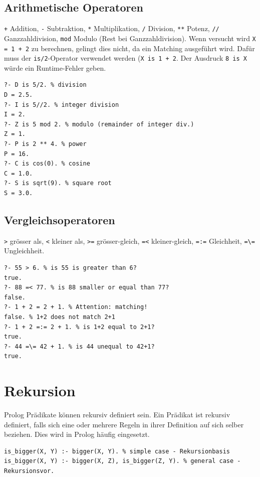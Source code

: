 \subsection{Arithmetische Operatoren}
\verb|+| Addition, \verb|-| Subtraktion, \verb|*| Multiplikation, \verb|/| Division, \verb|**| Potenz, \verb|//| Ganzzahldivision, \verb|mod| Modulo (Rest bei Ganzzahldivision). Wenn versucht wird \verb|X = 1 + 2| zu berechnen, gelingt dies nicht, da ein Matching ausgeführt wird. Dafür muss der \verb|is/2|-Operator verwendet werden (\verb|X is 1 + 2|. Der Ausdruck \verb|8 is X| würde ein Runtime-Fehler geben.

\begin{lstlisting}[caption=Arithmetische Terme]
?- D is 5/2. % division
D = 2.5.
?- I is 5//2. % integer division
I = 2.
?- Z is 5 mod 2. % modulo (remainder of integer div.)
Z = 1.
?- P is 2 ** 4. % power
P = 16.
?- C is cos(0). % cosine
C = 1.0.
?- S is sqrt(9). % square root
S = 3.0.
\end{lstlisting}

\newpage

\subsection{Vergleichsoperatoren}
\verb|>| grösser als, \verb|<| kleiner als, \verb|>=| grösser-gleich, \verb|=<| kleiner-gleich, \verb|=:=| Gleichheit, \verb|=\=| Ungleichheit.

\begin{lstlisting}[caption=Terme mit Vergleichen]
?- 55 > 6. % is 55 is greater than 6?
true.
?- 88 =< 77. % is 88 smaller or equal than 77?
false.
?- 1 + 2 = 2 + 1. % Attention: matching!
false. % 1+2 does not match 2+1
?- 1 + 2 =:= 2 + 1. % is 1+2 equal to 2+1?
true.
?- 44 =\= 42 + 1. % is 44 unequal to 42+1?
true.
\end{lstlisting}

\section{Rekursion}
Prolog Prädikate können rekursiv definiert sein. Ein Prädikat ist rekursiv definiert, falls sich eine oder mehrere Regeln in ihrer Definition auf sich selber beziehen. Dies wird in Prolog häufig eingesetzt.

\begin{lstlisting}[caption=Beispiel Rekursion]
is_bigger(X, Y) :- bigger(X, Y). % simple case - Rekursionbasis
is_bigger(X, Y) :- bigger(X, Z), is_bigger(Z, Y). % general case - Rekursionsvor.
\end{lstlisting}

